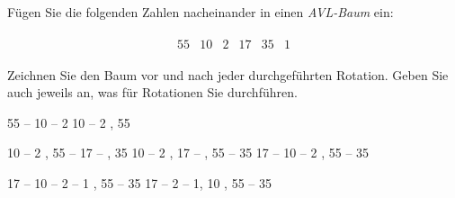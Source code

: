 Fügen Sie die folgenden Zahlen nacheinander in einen
\emph{AVL-Baum}
ein:

\begin{align*}
  \begin{array}{cccccc}
    55 & 10 & 2 & 17 & 35 & 1 
      \end{array}
\end{align*}

Zeichnen Sie den Baum vor und nach jeder durchgeführten Rotation.
Geben Sie auch jeweils an, was für Rotationen Sie durchführen.

\begin{solution}

\begin{tcbraster}[raster columns = 3, raster equal height=rows]
   { 55 -- { 10 -- 2 } }
         { 10 -- { 2 , 55 } }
  \blankbox

      { 10 -- { 2 , 55 -- { 17 -- { , 35 } } } }
    { 10 -- { 2 , 17 -- { , 55 -- 35 } } }
    { 17 -- { { 10 -- 2 }, { 55 -- 35 } } }

           { 17 -- { { 10 -- 2 -- 1 }, { 55 -- 35 } } }
         { 17 -- { { 2 -- { 1, 10 } }, { 55 -- 35 } } }
  \blankbox
\end{tcbraster}

\end{solution}
